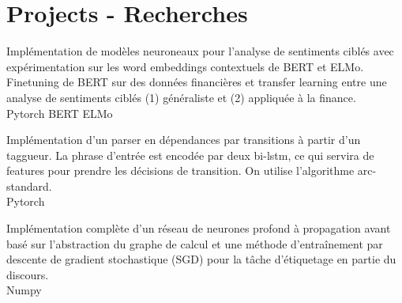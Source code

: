 \section{Projects - Recherches}

Implémentation de modèles neuroneaux pour l'analyse de sentiments ciblés avec expérimentation sur les word embeddings contextuels de BERT et ELMo. \\
Finetuning de BERT sur des données financières et transfer learning entre une analyse de sentiments ciblés (1) généraliste  et (2) appliquée à la finance. \\
\textbullet{} Pytorch \textbullet{} BERT \textbullet{} ELMo
\sectionsep


Implémentation d'un parser en dépendances par transitions à partir d'un taggueur. La phrase d'entrée est encodée par deux bi-lstm, ce qui servira de features pour prendre les décisions de transition. On utilise l'algorithme arc-standard. \\
\textbullet{} Pytorch  
\sectionsep


Implémentation complète d'un réseau de neurones profond à propagation avant basé sur l'abstraction du graphe de calcul et une méthode d'entraînement par descente de gradient stochastique (SGD) pour la tâche d'étiquetage en partie du discours.\\ 
\textbullet{} Numpy
\sectionsep